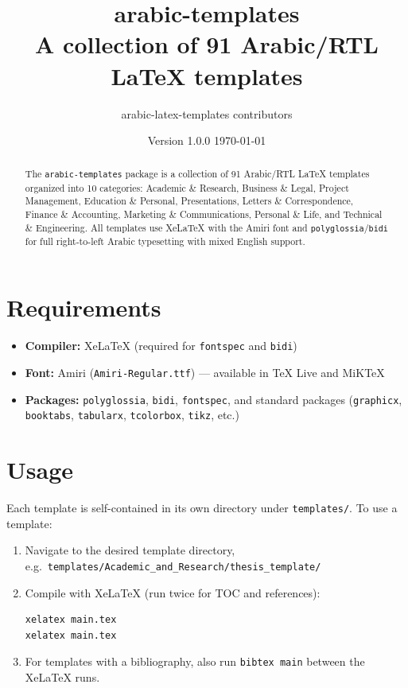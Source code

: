 \documentclass[11pt,a4paper]{article}
\title{\textbf{arabic-templates} \\[0.3em]
\large A collection of 91 Arabic/RTL LaTeX templates}
\author{arabic-latex-templates contributors}
\date{Version 1.0.0 \quad \today}
\begin{document}
\maketitle

\begin{abstract}
\noindent The \texttt{arabic-templates} package is a collection of 91 Arabic/RTL
LaTeX templates organized into 10 categories: Academic \& Research, Business \&
Legal, Project Management, Education \& Personal, Presentations, Letters \&
Correspondence, Finance \& Accounting, Marketing \& Communications, Personal \&
Life, and Technical \& Engineering. All templates use XeLaTeX with the Amiri
font and \texttt{polyglossia}/\texttt{bidi} for full right-to-left Arabic
typesetting with mixed English support.
\end{abstract}

\section{Requirements}
\label{sec:requirements}

\begin{itemize}
    \item \textbf{Compiler:} XeLaTeX (required for \texttt{fontspec} and \texttt{bidi})
    \item \textbf{Font:} Amiri (\texttt{Amiri-Regular.ttf}) --- available in TeX Live and MiKTeX
    \item \textbf{Packages:} \texttt{polyglossia}, \texttt{bidi}, \texttt{fontspec}, and standard packages (\texttt{graphicx}, \texttt{booktabs}, \texttt{tabularx}, \texttt{tcolorbox}, \texttt{tikz}, etc.)
\end{itemize}

\section{Usage}
\label{sec:usage}

Each template is self-contained in its own directory under \texttt{templates/}.
To use a template:

\begin{enumerate}
    \item Navigate to the desired template directory, e.g.\ \texttt{templates/Academic\_and\_Research/thesis\_template/}
    \item Compile with XeLaTeX (run twice for TOC and references):
    \begin{verbatim}
xelatex main.tex
xelatex main.tex
    \end{verbatim}
    \item For templates with a bibliography, also run \texttt{bibtex main} between the XeLaTeX runs.
\end{enumerate}
\end{document}
